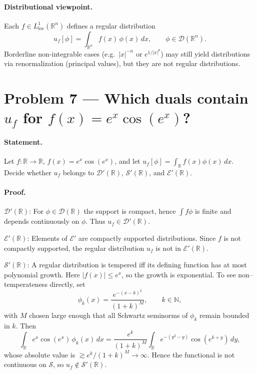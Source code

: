 \documentclass[12pt,a4paper]{article}
\theoremstyle{plain}
\theoremstyle{definition}
\theoremstyle{remark}
\theoremstyle{remark}
\begin{document}
\bigskip

\paragraph{Distributional viewpoint.}
Each $f\in L^1_{\mathrm{loc}}(\mathbb R^n)$ defines a regular distribution
\[
u_f[\phi]=\int_{\mathbb R^n} f(x)\,\phi(x)\,dx,\qquad \phi\in\mathcal D(\mathbb R^n).
\]
Borderline non-integrable cases (e.g.\ $|x|^{-n}$ or $e^{1/|x|^p}$) may still yield distributions via renormalization (principal values), but they are not regular distributions.

\section*{Problem 7 — Which duals contain $u_f$ for $f(x)=e^x\cos(e^x)$?}

\paragraph{Statement.}
Let $f:\mathbb R\to\mathbb R$, $f(x)=e^x\cos(e^x)$, and let $u_f[\phi]=\int_{\mathbb R} f(x)\phi(x)\,dx$.
Decide whether $u_f$ belongs to $\mathcal D'(\mathbb R)$, $\mathcal S'(\mathbb R)$, and $\mathcal E'(\mathbb R)$.

\paragraph{Proof.}

\smallskip

$\mathcal D'(\mathbb R)$: For $\phi\in\mathcal D(\mathbb R)$ the support is compact, hence $\int f\phi$ is finite and depends continuously on $\phi$.
Thus $u_f\in\mathcal D'(\mathbb R)$.

\smallskip

$\mathcal E'(\mathbb R)$: Elements of $\mathcal E'$ are compactly supported distributions. Since $f$ is not compactly supported,
the regular distribution $u_f$ is not in $\mathcal E'(\mathbb R)$.

\smallskip

$\mathcal S'(\mathbb R)$: A regular distribution is tempered iff its defining function has at most polynomial growth.
Here $|f(x)|\le e^x$, so the growth is exponential. To see non–temperateness directly, set
\[
\phi_k(x)=\frac{e^{-(x-k)^2}}{(1+k)^M},\qquad k\in\mathbb N,
\]
with $M$ chosen large enough that all Schwartz seminorms of $\phi_k$ remain bounded in $k$.
Then
\[
\int_{\mathbb R} e^x\cos(e^x)\,\phi_k(x)\,dx
= \frac{e^{k}}{(1+k)^M}\int_{\mathbb R} e^{-(y^2-y)}\cos(e^{k+y})\,dy,
\]
whose absolute value is $\gtrsim e^{k}/(1+k)^M\to\infty$.
Hence the functional is not continuous on $\mathcal S$, so $u_f\notin\mathcal S'(\mathbb R)$.
\end{document}
